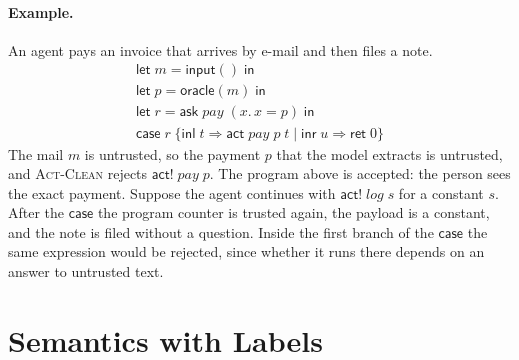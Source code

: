 \documentclass[acmsmall,nonacm,screen]{acmart}
\newcommand{\kw}[1]{\mathsf{#1}}
\newcommand{\nm}[1]{\mathit{#1}}
\newcommand{\ret}{\kw{ret}}
\newcommand{\ask}[2]{\kw{ask}\;#1\;(#2)}
\newcommand{\act}[3]{\kw{act}\;#1\;#2\;#3}
\newcommand{\actc}[2]{\kw{act!}\;#1\;#2}
\newcommand{\orc}[1]{\kw{oracle}(#1)}
\newcommand{\inp}{\kw{input}()}
\newcommand{\letin}[3]{\kw{let}\;#1 = #2\;\kw{in}\;#3}
\begin{document}
\paragraph{Example.}
An agent pays an invoice that arrives by e-mail and then files a note.
\[
\begin{array}{l}
\letin{m}{\inp}{} \\
\letin{p}{\orc{m}}{} \\
\letin{r}{\ask{\nm{pay}}{x.\,x = p}}{} \\
\kw{case}\;r\;\{\kw{inl}\;t \Rightarrow \act{\nm{pay}}{p}{t} \mid \kw{inr}\;u \Rightarrow
  \ret\;0\}
\end{array}
\]
The mail $m$ is untrusted, so the payment $p$ that the model extracts is untrusted, and
\textsc{Act-Clean} rejects $\actc{\nm{pay}}{p}$. The program above is accepted: the person sees
the exact payment. Suppose the agent continues with $\actc{\nm{log}}{s}$ for a constant $s$.
After the $\kw{case}$ the program counter is trusted again, the payload is a constant, and the
note is filed without a question. Inside the first branch of the $\kw{case}$ the same expression
would be rejected, since whether it runs there depends on an answer to untrusted text.

\section{Semantics with Labels}
\end{document}
